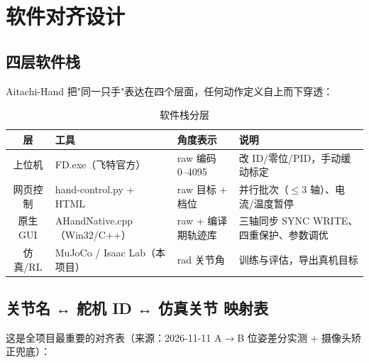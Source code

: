 \section{软件对齐设计}\label{sec:software}

\subsection{四层软件栈}
Aitachi-Hand 把"同一只手"表达在四个层面，任何动作定义自上而下穿透：

\begin{table}[h]\centering
\caption{软件栈分层}\label{tab:stack}
\begin{tabular}{clll}
\toprule
层 & 工具 & 角度表示 & 说明 \\
\midrule
上位机 & FD.exe（飞特官方） & raw 编码 0--4095 & 改 ID/零位/PID，手动缓动标定 \\
网页控制 & hand-control.py + HTML & raw 目标 + 档位 & 并行批次（$\le$3 轴）、电流/温度暂停 \\
原生 GUI & AHandNative.cpp（Win32/C++） & raw + 编译期轨迹库 & 三轴同步 SYNC WRITE、四重保护、参数调优 \\
仿真/RL & MuJoCo / Isaac Lab（本项目） & rad 关节角 & 训练与评估，导出真机目标 \\
\bottomrule
\end{tabular}
\end{table}

\subsection{关节名 ↔ 舵机 ID ↔ 仿真关节 映射表}
这是全项目最重要的对齐表（来源：2026-11-11 A$\to$B 位姿差分实测 + 摄像头矫正兜底）：

